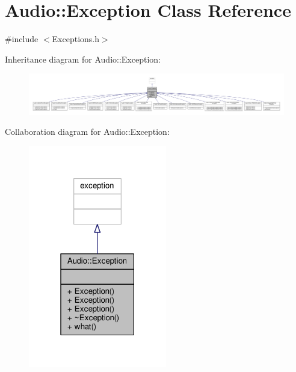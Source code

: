 \hypertarget{classAudio_1_1Exception}{}\section{Audio\+:\+:Exception Class Reference}
\label{classAudio_1_1Exception}


{\ttfamily \#include $<$Exceptions.\+h$>$}



Inheritance diagram for Audio\+:\+:Exception\+:
\nopagebreak
\begin{figure}[H]
\begin{center}
\leavevmode
\includegraphics[width=350pt]{d0/d16/classAudio_1_1Exception__inherit__graph}
\end{center}
\end{figure}


Collaboration diagram for Audio\+:\+:Exception\+:
\nopagebreak
\begin{figure}[H]
\begin{center}
\leavevmode
\includegraphics[width=171pt]{d1/df6/classAudio_1_1Exception__coll__graph}
\end{center}
\end{figure}
